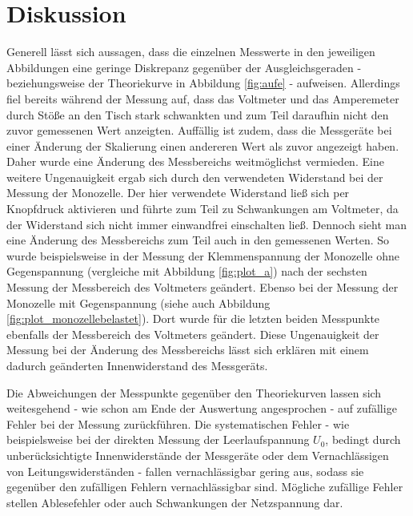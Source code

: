 \section{Diskussion}
\label{sec:Diskussion}
Generell lässt sich aussagen, dass die einzelnen Messwerte in den jeweiligen Abbildungen eine geringe Diskrepanz gegenüber der Ausgleichsgeraden - beziehungsweise der Theoriekurve in Abbildung \ref{fig:aufe} - aufweisen. Allerdings fiel bereits während der Messung auf, dass das Voltmeter und das Amperemeter durch Stöße an den Tisch stark schwankten und zum Teil daraufhin nicht den zuvor gemessenen Wert anzeigten.
Auffällig ist zudem, dass die Messgeräte bei einer Änderung der Skalierung einen andereren Wert als zuvor angezeigt haben. Daher wurde eine Änderung des Messbereichs weitmöglichst vermieden. Eine weitere Ungenauigkeit ergab sich durch den verwendeten Widerstand bei der Messung der Monozelle. Der hier verwendete Widerstand ließ sich per Knopfdruck aktivieren und führte zum Teil zu Schwankungen am Voltmeter, da der Widerstand sich nicht immer einwandfrei einschalten ließ.
Dennoch sieht man eine Änderung des Messbereichs zum Teil auch in den gemessenen Werten. So wurde beispielsweise in der Messung der Klemmenspannung der Monozelle ohne Gegenspannung (vergleiche mit Abbildung \ref{fig:plot_a}) nach der sechsten Messung der Messbereich des Voltmeters geändert.
Ebenso bei der Messung der Monozelle mit Gegenspannung (siehe auch Abbildung \ref{fig:plot_monozellebelastet}). Dort wurde für die letzten beiden Messpunkte ebenfalls der Messbereich des Voltmeters geändert.
Diese Ungenauigkeit der Messung bei der Änderung des Messbereichs lässt sich erklären mit einem dadurch geänderten Innenwiderstand des Messgeräts.

Die Abweichungen der Messpunkte gegenüber den Theoriekurven lassen sich weitesgehend - wie schon am Ende der Auswertung angesprochen - auf zufällige Fehler bei der Messung zurückführen.
Die systematischen Fehler - wie beispielsweise bei der direkten Messung der Leerlaufspannung $U_0$, bedingt durch unberücksichtigte Innenwiderstände der Messgeräte oder dem Vernachlässigen von Leitungswiderständen - fallen vernachlässigbar gering aus, sodass sie gegenüber den zufälligen Fehlern vernachlässigbar sind.
Mögliche zufällige Fehler stellen Ablesefehler oder auch Schwankungen der Netzspannung dar.
